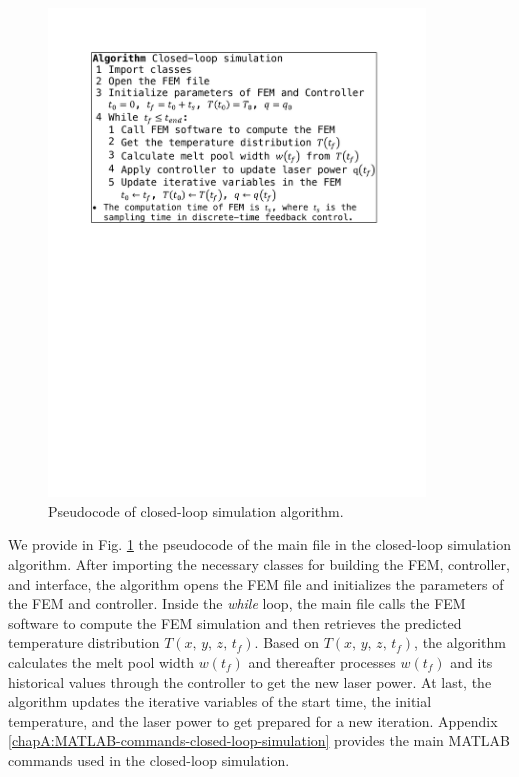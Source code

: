 \documentclass [11pt, proquest] {uwthesis}[2020/02/24]
\begin{document}
\begin{figure}[!ht]
\begin{centering}
\includegraphics[clip,width=10cm]{Closed-loop-simulation/pseudocode_math}
\par\end{centering}
\centering{}\caption{\label{fig:Pseudocode-for-the}Pseudocode of closed-loop simulation
algorithm.}
\end{figure}
We provide in Fig. \ref{fig:Pseudocode-for-the} the pseudocode of
the main file in the closed-loop simulation algorithm. After importing
the necessary classes for building the FEM, controller, and interface,
the algorithm opens the FEM file and initializes the parameters of
the FEM and controller. Inside the \emph{while} loop, the main file
calls the FEM software to compute the FEM simulation and then retrieves
the predicted temperature distribution $T(x,\,y,\,z,\,t_{f})$. Based
on $T(x,\,y,\,z,\,t_{f})$, the algorithm calculates the melt pool
width $w(t_{f})$ and thereafter processes $w(t_{f})$ and its historical
values through the controller to get the new laser power. At last,
the algorithm updates the iterative variables of the start time, the
initial temperature, and the laser power to get prepared for a new
iteration. Appendix \ref{chapA:MATLAB-commands-closed-loop-simulation} provides the main MATLAB commands used in
the closed-loop simulation.
\end{document}
